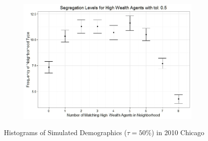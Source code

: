\begin{figure}[h!]
\begin{subfigure}{.5\textwidth}
\end{subfigure}%
\begin{subfigure}{.5\textwidth}
  \centering
\includegraphics[scale=.35]{figures/2010_5_High.jpeg}
\end{subfigure}
\caption[Simulated Demographics ($\tau = 50\%$); 2010 Chicago]{Histograms of Simulated Demographics ($\tau = 50\%$) in 2010 Chicago}
\end{figure}